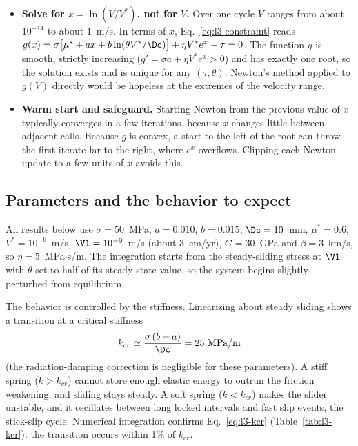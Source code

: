 \begin{itemize}[itemsep=1pt,topsep=2pt]
\item \textbf{Solve for $x=\ln(V/V^*)$, not for $V$.} Over one cycle $V$ ranges from about $10^{-14}$ to about $1$~m/s. In terms of $x$, Eq.~\eqref{eq:l3-constraint} reads $g(x)=\sigma\big[\mu^*+ax+b\ln(\theta V^*/\Dc)\big]+\eta V^*e^{x}-\tau=0$. The function $g$ is smooth, strictly increasing ($g'=\sigma a+\eta V^*e^x>0$) and has exactly one root, so the solution exists and is unique for any $(\tau,\theta)$. Newton's method applied to $g(V)$ directly would be hopeless at the extremes of the velocity range.
\item \textbf{Warm start and safeguard.} Starting Newton from the previous value of $x$ typically converges in a few iterations, because $x$ changes little between adjacent calls. Because $g$ is convex, a start to the left of the root can throw the first iterate far to the right, where $e^x$ overflows. Clipping each Newton update to a few units of $x$ avoids this.
\end{itemize}


\subsection{Parameters and the behavior to expect}

All results below use $\sigma=50$~MPa, $a=0.010$, $b=0.015$, $\Dc=10$~mm, $\mu^*=0.6$, $V^*=10^{-6}$~m/s, $\Vl=10^{-9}$~m/s (about 3~cm/yr), $G=30$~GPa and $\beta=3$~km/s, so $\eta=5$~MPa$\cdot$s/m. The integration starts from the steady-sliding stress at $\Vl$ with $\theta$ set to half of its steady-state value, so the system begins slightly perturbed from equilibrium.

The behavior is controlled by the stiffness. Linearizing about steady sliding shows a transition at a critical stiffness
\begin{equation}
k_{cr}\simeq\frac{\sigma\,(b-a)}{\Dc}=25\ \text{MPa/m}
\label{eq:l3-kcr}
\end{equation}
(the radiation-damping correction is negligible for these parameters). A stiff spring ($k>k_{cr}$) cannot store enough elastic energy to outrun the friction weakening, and sliding stays steady. A soft spring ($k<k_{cr}$) makes the slider unstable, and it oscillates between long locked intervals and fast slip events, the stick-slip cycle. Numerical integration confirms Eq.~\eqref{eq:l3-kcr} (Table~\ref{tab:l3-kcr}): the transition occurs within 1\% of $k_{cr}$.


